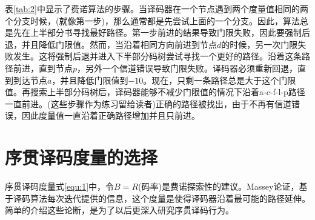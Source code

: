 \documentclass[twoside,numberorder]{buptthesis}
\begin{document}
表\ref{tab:2}中显示了费诺算法的步骤。当译码器在一个节点遇到两个度量值相同的两个分支时候，(就像第一步)，那么通常都是先尝试上面的一个分支。因此，算法总是先在上半部分书寻找最好路径。第一步前进的结果导致门限失败，因此要强制后退，并且降低门限值。然而，当沿着相同方向前进到节点$d$的时候，另一次门限失败发生。这将强制后退并进入下半部分码树尝试寻找一个更好的路径。沿着这条路径前进，直到节点$p$，另外一个信道错误导致门限失败。译码器必须重新回退，直到到达节点$a$，并且降低门限值到$-10$。现在，只剩一条路径总是大于这个门限值。再搜索上半部分码树后，译码器能够不减少门限值的情况下沿着a-c-f-l-p路径一直前进。(这些步骤作为练习留给读者)正确的路径被找出，由于不再有信道错误，因此度量值一直沿着正确路径增加并且只前进。

\section{序贯译码度量的选择}
序贯译码度量式\ref{equ:1}中，令$B=R$(码率)是费诺探索性的建议。Massey论证，基于译码算法每次迭代提供的信息，这个度量是使得译码器沿着最可能的路径延伸。简单的介绍这些论断，是为了以后更深入研究序贯译码行为。
\end{document}
